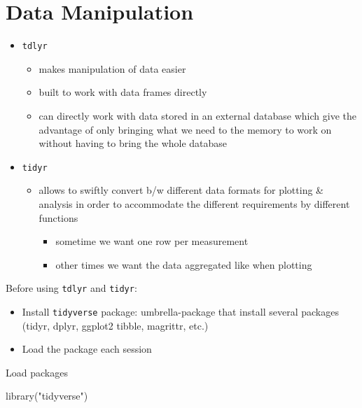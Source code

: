 \documentclass[
  letterpaper,
  DIV=11,
  numbers=noendperiod]{scrreprt}
\newenvironment{Shaded}{\begin{snugshade}}{\end{snugshade}}
\newcommand{\FunctionTok}[1]{\textcolor[rgb]{0.28,0.35,0.67}{#1}}
\newcommand{\NormalTok}[1]{\textcolor[rgb]{0.00,0.23,0.31}{#1}}
\newcommand{\StringTok}[1]{\textcolor[rgb]{0.13,0.47,0.30}{#1}}
\providecommand{\tightlist}{%
  \setlength{\itemsep}{0pt}\setlength{\parskip}{0pt}}\usepackage{longtable,booktabs,array}
\begin{document}
\section{Data Manipulation}\label{data-manipulation}

\begin{itemize}
\tightlist
\item
  \texttt{tdlyr}

  \begin{itemize}
  \tightlist
  \item
    makes manipulation of data easier
  \item
    built to work with data frames directly
  \item
    can directly work with data stored in an external database which
    give the advantage of only bringing what we need to the memory to
    work on without having to bring the whole database
  \end{itemize}
\item
  \texttt{tidyr}

  \begin{itemize}
  \tightlist
  \item
    allows to swiftly convert b/w different data formats for plotting \&
    analysis in order to accommodate the different requirements by
    different functions

    \begin{itemize}
    \tightlist
    \item
      sometime we want one row per measurement
    \item
      other times we want the data aggregated like when plotting
    \end{itemize}
  \end{itemize}
\end{itemize}

Before using \texttt{tdlyr} and \texttt{tidyr}:

\begin{itemize}
\tightlist
\item
  Install \texttt{tidyverse} package: umbrella-package that install
  several packages (tidyr, dplyr, ggplot2 tibble, magrittr, etc.)
\item
  Load the package each session
\end{itemize}

Load packages

\begin{Shaded}
\begin{Highlighting}[]
\FunctionTok{library}\NormalTok{(}\StringTok{"tidyverse"}\NormalTok{)}
\end{Highlighting}
\end{Shaded}
\end{document}
